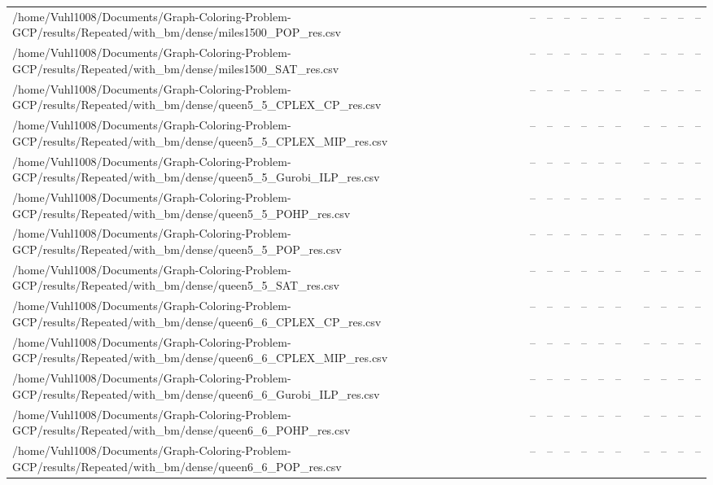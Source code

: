 \begin{table}[htbp]
\begin{tabular}{llllllllllll}
/home/Vuhl1008/Documents/Graph-Coloring-Problem-GCP/results/Repeated/with\_bm/dense/miles1500\_POP\_res.csv & -- & -- & -- & -- & -- & -- & {} & -- & -- & -- & -- \\
/home/Vuhl1008/Documents/Graph-Coloring-Problem-GCP/results/Repeated/with\_bm/dense/miles1500\_SAT\_res.csv & -- & -- & -- & -- & -- & -- & {} & -- & -- & -- & -- \\
/home/Vuhl1008/Documents/Graph-Coloring-Problem-GCP/results/Repeated/with\_bm/dense/queen5\_5\_CPLEX\_CP\_res.csv & -- & -- & -- & -- & -- & -- & {} & -- & -- & -- & -- \\
/home/Vuhl1008/Documents/Graph-Coloring-Problem-GCP/results/Repeated/with\_bm/dense/queen5\_5\_CPLEX\_MIP\_res.csv & -- & -- & -- & -- & -- & -- & {} & -- & -- & -- & -- \\
/home/Vuhl1008/Documents/Graph-Coloring-Problem-GCP/results/Repeated/with\_bm/dense/queen5\_5\_Gurobi\_ILP\_res.csv & -- & -- & -- & -- & -- & -- & {} & -- & -- & -- & -- \\
/home/Vuhl1008/Documents/Graph-Coloring-Problem-GCP/results/Repeated/with\_bm/dense/queen5\_5\_POHP\_res.csv & -- & -- & -- & -- & -- & -- & {} & -- & -- & -- & -- \\
/home/Vuhl1008/Documents/Graph-Coloring-Problem-GCP/results/Repeated/with\_bm/dense/queen5\_5\_POP\_res.csv & -- & -- & -- & -- & -- & -- & {} & -- & -- & -- & -- \\
/home/Vuhl1008/Documents/Graph-Coloring-Problem-GCP/results/Repeated/with\_bm/dense/queen5\_5\_SAT\_res.csv & -- & -- & -- & -- & -- & -- & {} & -- & -- & -- & -- \\
/home/Vuhl1008/Documents/Graph-Coloring-Problem-GCP/results/Repeated/with\_bm/dense/queen6\_6\_CPLEX\_CP\_res.csv & -- & -- & -- & -- & -- & -- & {} & -- & -- & -- & -- \\
/home/Vuhl1008/Documents/Graph-Coloring-Problem-GCP/results/Repeated/with\_bm/dense/queen6\_6\_CPLEX\_MIP\_res.csv & -- & -- & -- & -- & -- & -- & {} & -- & -- & -- & -- \\
/home/Vuhl1008/Documents/Graph-Coloring-Problem-GCP/results/Repeated/with\_bm/dense/queen6\_6\_Gurobi\_ILP\_res.csv & -- & -- & -- & -- & -- & -- & {} & -- & -- & -- & -- \\
/home/Vuhl1008/Documents/Graph-Coloring-Problem-GCP/results/Repeated/with\_bm/dense/queen6\_6\_POHP\_res.csv & -- & -- & -- & -- & -- & -- & {} & -- & -- & -- & -- \\
/home/Vuhl1008/Documents/Graph-Coloring-Problem-GCP/results/Repeated/with\_bm/dense/queen6\_6\_POP\_res.csv & -- & -- & -- & -- & -- & -- & {} & -- & -- & -- & -- \\

\end{tabular}
\end{table}
